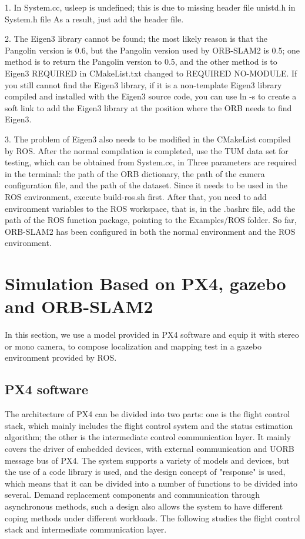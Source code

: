\documentclass[conference]{IEEEtran}
\begin{document}
1. In System.cc, usleep is undefined; this is due to missing header file unistd.h in System.h file
As a result, just add the header file.

2. The Eigen3 library cannot be found; the most likely reason is that the Pangolin version is 0.6, but the Pangolin version used by ORB-SLAM2 is 0.5; one method is to return the Pangolin version to 0.5, and the other method is to
Eigen3 REQUIRED in CMakeList.txt changed to REQUIRED NO-MODULE. If you still cannot find the Eigen3 library, if it is a non-template Eigen3 library compiled and installed with the Eigen3 source code, you can use ln -s to create a soft link to add the Eigen3 library at the position where the ORB needs to find Eigen3.

3. The problem of Eigen3 also needs to be modified in the CMakeList compiled by ROS.
After the normal compilation is completed, use the TUM data set for testing, which can be obtained from System.cc, in
Three parameters are required in the terminal: the path of the ORB dictionary, the path of the camera configuration file, and the path of the dataset. Since it needs to be used in the ROS environment, execute build-ros.sh first. After that, you need to add environment variables to the ROS workspace, that is, in the .bashrc file, add the path of the ROS function package, pointing to the Examples/ROS folder. So far, ORB-SLAM2 has been configured in both the normal environment and the ROS environment.

\section{Simulation Based on PX4, gazebo and ORB-SLAM2}

In this section, we use a model provided in PX4 software and equip it with stereo or mono camera,
to compose localization and mapping test in a gazebo environment provided by ROS.

\subsection{PX4 software}
The architecture of PX4 can be divided into two parts: one is the flight control stack, 
which mainly includes the flight control system and the status estimation algorithm; 
the other is the intermediate control communication layer. 
It mainly covers the driver of embedded devices, 
with external communication and UORB message bus of PX4. 
The system supports a variety of models and devices, 
but the use of a code library is used, and the design concept of "response" is used, 
which means that it can be divided into a number of functions to be divided into several. 
Demand replacement components and communication through asynchronous methods, 
such a design also allows the system to have different coping methods under different workloads. 
The following studies the flight control stack and intermediate communication layer.
\end{document}
